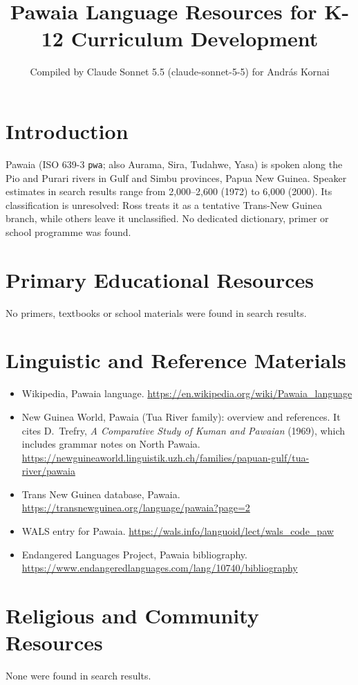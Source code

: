 \documentclass[12pt]{article}
\title{Pawaia Language Resources for K-12 Curriculum Development}
\author{Compiled by Claude Sonnet 5.5 (claude-sonnet-5-5) for Andr\'as Kornai}
\date{}
\begin{document}
\maketitle

\section{Introduction}
Pawaia (ISO 639-3 \texttt{pwa}; also Aurama, Sira, Tudahwe, Yasa) is spoken along the Pio and Purari rivers in Gulf and Simbu provinces, Papua New Guinea. Speaker estimates in search results range from 2,000--2,600 (1972) to 6,000 (2000). Its classification is unresolved: Ross treats it as a tentative Trans-New Guinea branch, while others leave it unclassified. No dedicated dictionary, primer or school programme was found.

\section{Primary Educational Resources}
No primers, textbooks or school materials were found in search results.

\section{Linguistic and Reference Materials}
\begin{itemize}
\item Wikipedia, Pawaia language. \url{https://en.wikipedia.org/wiki/Pawaia_language}
\item New Guinea World, Pawaia (Tua River family): overview and references. It cites D.\ Trefry, \emph{A Comparative Study of Kuman and Pawaian} (1969), which includes grammar notes on North Pawaia. \url{https://newguineaworld.linguistik.uzh.ch/families/papuan-gulf/tua-river/pawaia}
\item Trans New Guinea database, Pawaia. \url{https://transnewguinea.org/language/pawaia?page=2}
\item WALS entry for Pawaia. \url{https://wals.info/languoid/lect/wals_code_paw}
\item Endangered Languages Project, Pawaia bibliography. \url{https://www.endangeredlanguages.com/lang/10740/bibliography}
\end{itemize}

\section{Religious and Community Resources}
None were found in search results.
\end{document}

